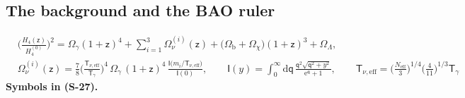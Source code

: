 \documentclass[
  10pt,
]{article}
\begin{document}
\hypertarget{the-background-and-the-bao-ruler}{%
\subsection{The background and the BAO
ruler}\label{the-background-and-the-bao-ruler}}

\[
\begin{aligned}
&\Big(\frac{H_4(\mathsf{z})}{H_4^{(0)}}\Big)^2 = \Omega_{\gamma}(1 + \mathsf{z})^4 + \sum_{i=1}^{3}\Omega_{\nu}^{(i)}(\mathsf{z}) + \big(\Omega_{\mathrm{b}} + \Omega_\chi\big)(1 + \mathsf{z})^3 + \Omega_\Lambda,\\
&\Omega_{\nu}^{(i)}(\mathsf{z}) = \frac78\Big(\frac{\mathsf{T}_{\nu,\mathrm{eff}}}{\mathsf{T}_\gamma}\Big)^4\,\Omega_{\gamma}\,(1 + \mathsf{z})^4\,
 \frac{\mathsf{I}\big(m_i/\mathsf{T}_{\nu,\mathrm{eff}}\big)}{\mathsf{I}(0)},\qquad
 \mathsf{I}(y) = \int_0^\infty\mathrm{d}\mathsf{q}\,\frac{\mathsf{q}^2\sqrt{\mathsf{q}^2 + y^2}}{\mathrm{e}^{\mathsf{q}} + 1},\qquad
 \mathsf{T}_{\nu,\mathrm{eff}} = \Big(\frac{N_{\mathrm{eff}}}{3}\Big)^{1/4}\Big(\frac{4}{11}\Big)^{1/3}\mathsf{T}_\gamma
\end{aligned} \tag{S-27}
\] \textbf{Symbols in (S-27).}
\end{document}
